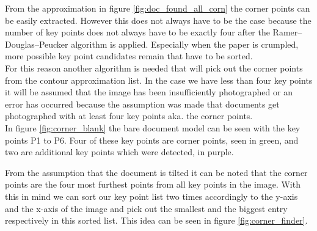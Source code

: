 From the approximation in figure \ref{fig:doc_found_all_corn} the corner points can be easily extracted. However this does not always have to be the case because the number of key points does not always have to be exactly four after the Ramer–Douglas–Peucker algorithm is applied. Especially when the paper is crumpled, more possible key point candidates remain that have to be sorted. \\

For this reason another algorithm is needed that will pick out the corner points from the contour approximation list. In the case we have less than four key points it will be assumed that the image has been insufficiently photographed or an error has occurred because the assumption was made that documents get photographed with at least four key points aka. the corner points.\\

In figure \ref{fig:corner_blank} the bare document model can be seen with the key points P1 to P6. Four of these key points are corner points, seen in green, and two are additional key points which were detected, in purple. \\

\newpage

From the assumption that the document is tilted it can be noted that the corner points are the four most furthest points from all key points in the image. With this in mind we can sort our key point list two times accordingly to the y-axis and the x-axis of the image and pick out the smallest and the biggest entry respectively in this sorted list. This idea can be seen in figure \ref{fig:corner_finder}.\\ 

\vspace{-3mm}

